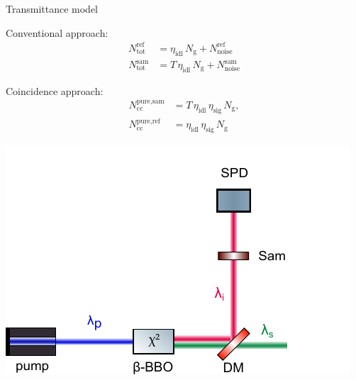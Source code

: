 \documentclass[10pt,aspectratio=43]{beamer}
\begin{document}
	\begin{frame}{Transmittance model}
		\begin{minipage}{.4\textwidth}
			\centering
			Conventional approach:
			\begin{equation}
				\begin{aligned}
					N_{\text{tot}}^{\text{ref}} &= \eta_{\text{idl}} \, N_{\mathrm{g}} 	+ N_{\text{noise}}^{\text{ref}} \\[0.5em]
					N_{\text{tot}}^{\text{sam}} &= T \, \eta_{\text{idl}} \, 	N_{\mathrm{g}} + N_{\text{noise}}^{\text{sam}}
				\end{aligned}
				\label{eq:SingleSam}
				\nonumber
			\end{equation}
		\end{minipage}
		\hfill
		\begin{minipage}{.4\textwidth}
			\centering
			Coincidence approach:
			\begin{equation}
				\begin{aligned}
					N_{\text{cc}}^{\text{pure,sam}} &= T \,\eta_{\text{idl}} \,\eta_{\text{sig}} \, N_{\mathrm{g}}, \\[0.5em]
					N_{\text{cc}}^{\text{pure,ref}} &= \eta_{\text{idl}} \,\eta_{\text{sig}} \, N_{\mathrm{g}}
				\end{aligned}
				\label{eq:pureCoinc}
				\nonumber
			\end{equation}
		\end{minipage}
	\end{frame}
	\begin{frame}
			\begin{minipage}{.6\textwidth}
				\centering
				\includegraphics[width=.7\textwidth]{Images/ConventionalSetup.pdf}
			\end{minipage}
	\end{frame}
\end{document}
